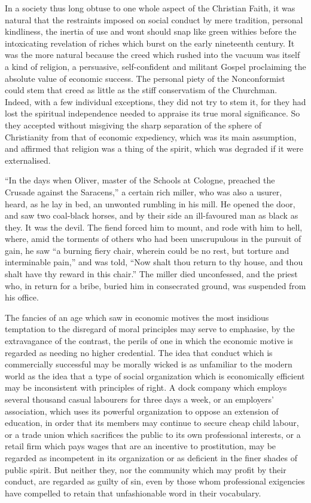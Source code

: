 \documentclass{book}
\begin{document}
In a society thus long obtuse to one whole aspect of the Christian Faith, it was natural that the restraints imposed on social conduct by mere tradition, personal kindliness, the inertia of use and wont should snap like green withies before the intoxicating revelation of riches which burst on the early nineteenth century. It was the more natural because the creed which rushed into the vacuum was itself a kind of religion, a persuasive, self-confident and militant Gospel proclaiming the absolute value of economic success. The personal piety of the Nonconformist could stem that creed as little as the stiff conservatism of the Churchman. Indeed, with a few individual exceptions, they did not try to stem it, for they had lost the spiritual independence needed to appraise its true moral significance. So they accepted without misgiving the sharp separation of the sphere of Christianity from that of economic expediency, which was its main assumption, and affirmed that religion was a thing of the spirit, which was degraded if it were externalised.

“In the days when Oliver, master of the Schools at Cologne, preached the Crusade against the Saracens,” a certain rich miller, who was also a usurer, heard, as he lay in bed, an unwonted rumbling in his mill. He opened the door, and saw two coal-black horses, and by their side an ill-favoured man as black as they. It was the devil. The fiend forced him to mount, and rode with him to hell, where, amid the torments of others who had been unscrupulous in the pursuit of gain, he saw “a burning fiery chair, wherein could be no rest, but torture and interminable pain,” and was told, “Now shalt thou return to thy house, and thou shalt have thy reward in this chair.” The miller died unconfessed, and the priest who, in return for a bribe, buried him in consecrated ground, was suspended from his office.

The fancies of an age which saw in economic motives the most insidious temptation to the disregard of moral principles may serve to emphasise, by the extravagance of the contrast, the perils of one in which the economic motive is regarded as needing no higher credential. The idea that conduct which is commercially successful may be morally wicked is as unfamiliar to the modern world as the idea that a type of social organization which is economically efficient may be inconsistent with principles of right. A dock company which employs several thousand casual labourers for three days a week, or an employers’ association, which uses its powerful organization to oppose an extension of education, in order that its members may continue to secure cheap child labour, or a trade union which sacrifices the public to its own professional interests, or a retail firm which pays wages that are an incentive to prostitution, may be regarded as incompetent in its organization or as deficient in the finer shades of public spirit. But neither they, nor the community which may profit by their conduct, are regarded as guilty of sin, even by those whom professional exigencies have compelled to retain that unfashionable word in their vocabulary.
\end{document}
